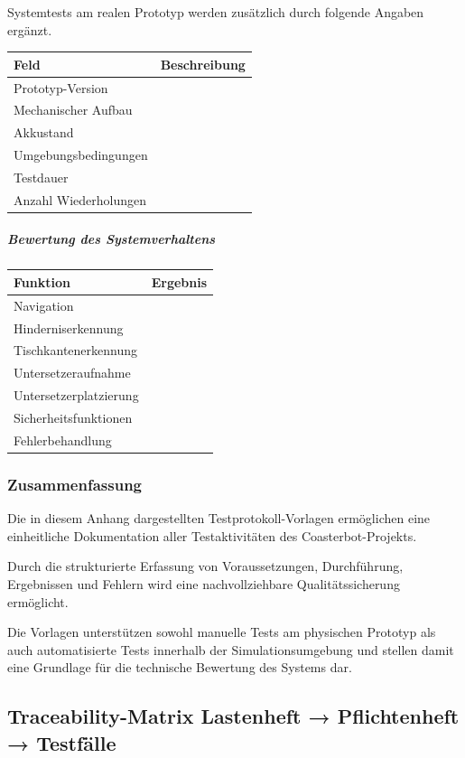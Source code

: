 \documentclass[
  a4paper,
  12pt,
  DIV=12,        %
  parskip=half,  %
  headings=small %
]{scrartcl}
\theoremstyle{definition}
\theoremstyle{definition}
\begin{document}
Systemtests am realen Prototyp werden zusätzlich durch folgende Angaben
ergänzt.

\begin{longtable}[]{@{}ll@{}}
\toprule\noalign{}
Feld & Beschreibung \\
\midrule\noalign{}
\endhead
\bottomrule\noalign{}
\endlastfoot
Prototyp-Version & \\
Mechanischer Aufbau & \\
Akkustand & \\
Umgebungsbedingungen & \\
Testdauer & \\
Anzahl Wiederholungen & \\
\end{longtable}

\subparagraph{Bewertung des
Systemverhaltens}\label{bewertung-des-systemverhaltens}

\begin{longtable}[]{@{}ll@{}}
\toprule\noalign{}
Funktion & Ergebnis \\
\midrule\noalign{}
\endhead
\bottomrule\noalign{}
\endlastfoot
Navigation & \\
Hinderniserkennung & \\
Tischkantenerkennung & \\
Untersetzeraufnahme & \\
Untersetzerplatzierung & \\
Sicherheitsfunktionen & \\
Fehlerbehandlung & \\
\end{longtable}

\subsubsection{Zusammenfassung}\label{zusammenfassung-5}

Die in diesem Anhang dargestellten Testprotokoll-Vorlagen ermöglichen
eine einheitliche Dokumentation aller Testaktivitäten des
Coasterbot-Projekts.

Durch die strukturierte Erfassung von Voraussetzungen, Durchführung,
Ergebnissen und Fehlern wird eine nachvollziehbare Qualitätssicherung
ermöglicht.

Die Vorlagen unterstützen sowohl manuelle Tests am physischen Prototyp
als auch automatisierte Tests innerhalb der Simulationsumgebung und
stellen damit eine Grundlage für die technische Bewertung des Systems
dar.

\subsection{Traceability-Matrix Lastenheft → Pflichtenheft →
Testfälle}\label{traceability-matrix-lastenheft-pflichtenheft-testfuxe4lle}
\end{document}
